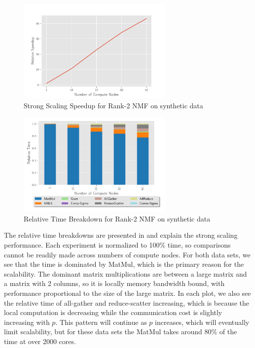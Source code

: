 \begin{figure}
\begin{center}
\includegraphics[height=2in, width=\columnwidth]{plots/synthetic_rank2_speedup.pdf}
\caption{Strong Scaling Speedup for Rank-2 NMF on synthetic data}
\label{fig:synrank2speedup}
\end{center}
\end{figure}

\begin{figure}
\begin{center}
\includegraphics[height=2in, width=\columnwidth]{plots/synthetic_rank2_strongscaling.pdf}
\caption{Relative Time Breakdown for Rank-2 NMF on synthetic data}
\label{fig:synrank2strongscaling}
\end{center}
\end{figure}

The relative time breakdowns are presented in  and explain the strong scaling performance.
Each experiment is normalized to 100\% time, so comparisons cannot be readily made across numbers of compute nodes. 
For both data sets, we see that the time is dominated by MatMul, which is the primary reason for the scalability.
The dominant matrix multiplications are between a large matrix and a matrix with 2 columns, so it is locally memory bandwidth bound, with performance proportional to the size of the large matrix.
In each plot, we also see the relative time of all-gather and reduce-scatter increasing, which is because the local computation is decreasing while the communication cost is slightly increasing with $p$.
This pattern will continue as $p$ increases, which will eventually limit scalability, but for these data sets the MatMul takes around 80\% of the time at over 2000 cores.

